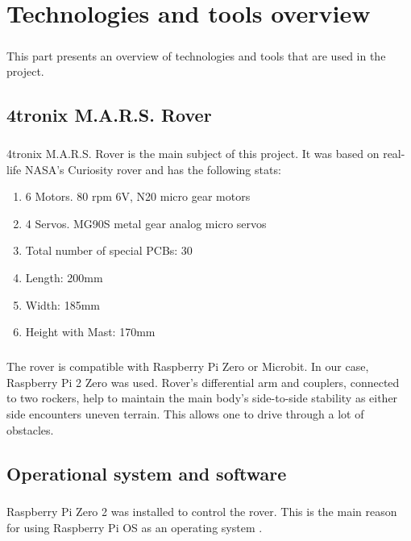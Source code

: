 \chapter{Technologies and tools overview}
\paragraph{}This part presents an overview of technologies and tools that are used in the project.

\section{4tronix M.A.R.S. Rover}%

\paragraph{}4tronix M.A.R.S. Rover is the main subject of this project. It was based on real-life NASA's Curiosity rover and has the following stats\cite{rover:assembly}:
\begin{enumerate}
  \item 6 Motors. 80 rpm 6V, N20 micro gear motors 
  \item 4 Servos. MG90S metal gear analog micro servos
  \item Total number of special PCBs: 30
  \item Length: 200mm
  \item Width: 185mm
  \item Height with Mast: 170mm
\end{enumerate}
\paragraph{}The rover is compatible with Raspberry Pi Zero or Microbit. In our case, Raspberry Pi 2 Zero was used. 
Rover's differential arm and couplers, connected to two rockers, help to maintain the main body’s side-to-side stability as either side encounters uneven terrain. This allows one to drive through a lot of obstacles.

\section{Operational system and software}%
\paragraph{}Raspberry Pi Zero 2 was installed to control the rover. This is the main reason for using Raspberry Pi OS as an operating system \cite{pi:os}. 

